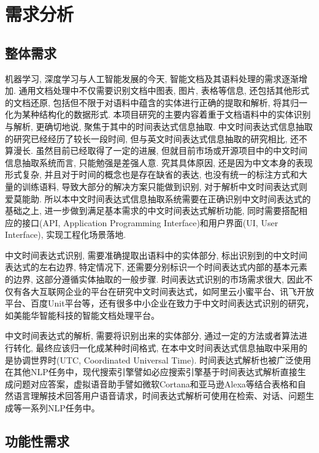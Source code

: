 
\chapter{需求分析}

\section{整体需求}

机器学习, 深度学习与人工智能发展的今天, 智能文档及其语料处理的需求逐渐增加.
通用文档处理中不仅需要识别文档中图表, 图片, 表格等信息, 还包括其他形式的文档还原, 包括但不限于对语料中蕴含的实体进行正确的提取和解析, 将其归一化为某种结构化的数据形式.
本项目研究的主要内容着重于文档语料中的实体识别与解析, 更确切地说, 聚焦于其中的时间表达式信息抽取.
中文时间表达式信息抽取的研究已经经历了较长一段时间, 但与英文时间表达式信息抽取的研究相比, 还不算漫长.
虽然目前已经取得了一定的进展, 但就目前市场或开源项目中的中文时间信息抽取系统而言, 只能勉强是差强人意.
究其具体原因, 还是因为中文本身的表现形式复杂, 并且对于时间的概念也是存在缺省的表达, 也没有统一的标注方式和大量的训练语料, 导致大部分的解决方案只能做到识别, 对于解析中文时间表达式则爱莫能助.
所以本中文时间表达式信息抽取系统需要在正确识别中文时间表达式的基础之上, 进一步做到满足基本需求的中文时间表达式解析功能, 同时需要搭配相应的接口(API, Application Programming Interface)和用户界面(UI, User Interface), 实现工程化场景落地.

中文时间表达式识别, 需要准确提取出语料中的实体部分, 标出识别到的中文时间表达式的左右边界, 特定情况下, 还需要分别标识一个时间表达式内部的基本元素的边界, 这部分遵循实体抽取的一般步骤.
时间表达式识别的市场需求很大, 因此不仅有各大互联网企业的平台在研究中文时间表达式，如阿里云小蜜平台、讯飞开放平台、百度Unit平台等，还有很多中小企业在致力于中文时间表达式识别的研究，如美能华智能科技的智能文档处理平台。

中文时间表达式的解析, 需要将识别出来的实体部分, 通过一定的方法或者算法进行转化, 最终应该归一化成某种时间格式, 在本中文时间表达式信息抽取中采用的是协调世界时(UTC, Coordinated Universal Time).
时间表达式解析也被广泛使用在其他NLP任务中，现代搜索引擎譬如必应搜索引擎基于时间表达式解析直接生成问题对应答案，虚拟语音助手譬如微软Cortana和亚马逊Alexa等结合表格和自然语言理解技术回答用户语音请求，时间表达式解析可使用在检索、对话、问题生成等一系列NLP任务中。


\section{功能性需求}

